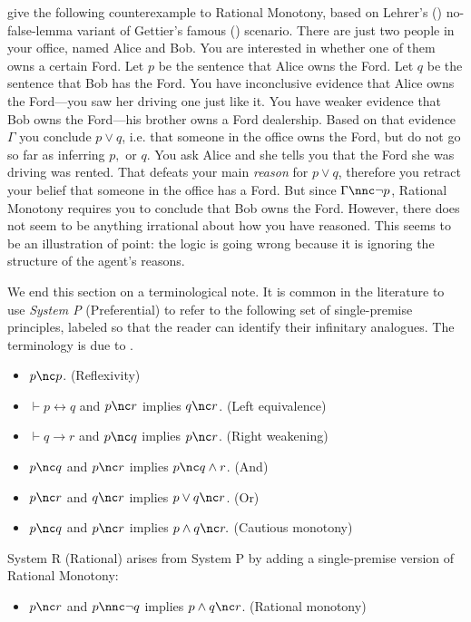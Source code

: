 \citet{lin2019correspondence} give the following counterexample to Rational
Monotony, based on Lehrer's () no-false-lemma
variant of Gettier's famous () scenario.
There are just two people in your office, named Alice and Bob. You are
interested in whether one of them owns a certain Ford. Let $p$ be the sentence
that Alice owns the Ford. Let $q$ be the sentence that Bob has the Ford. You
have inconclusive evidence that Alice owns the Ford---you saw her driving one
just like it. You have weaker evidence that Bob owns the Ford---his brother owns
a Ford dealership. Based on that evidence $\Gamma$ you conclude $p\vee q$, i.e.
that someone in the office owns the Ford, but do not go so far as inferring $p,$
or $q$. You ask Alice and she tells you that the Ford she was driving was
rented. That defeats your main {\em reason} for $p\vee q$, therefore you retract
your belief that someone in the office has a Ford. But since $\Gamma \nnc \neg
p$,  Rational Monotony requires you to conclude that Bob owns the Ford. However,
there does not seem to be anything irrational about how you have reasoned. This
seems to be an illustration of  point: the logic
is going wrong because it is ignoring the structure of the agent's reasons.

We end this section on a terminological note. It is common in the literature to
use \textit{System P} (Preferential) to refer to the following set of
single-premise principles, labeled so that the reader can identify their
infinitary analogues. The terminology is due to \citet{kraus1990nonmonotonic}.
\begin{itemize}
\item[] $p\nc p$. \hfill(Reflexivity)
\item[] $\vdash p \leftrightarrow q$ and $p \nc r$ implies $q \nc r$.
\hfill(Left equivalence)
\item[] $\vdash q \rightarrow r$ and $p \nc q$ implies $p \nc r$. \hfill(Right
weakening)
\item[] $p \nc q$ and $p \nc r$ implies $p \nc q\wedge r$. \hfill(And)
\item[] $p \nc r$ and $q\nc r$ implies $p\vee q \nc r$. \hfill(Or)
\item[] $p\nc q$ and $p\nc r$ implies $p\wedge q \nc r.$ \hfill(Cautious
monotony)
\end{itemize}
System R (Rational) arises from System P by adding  a single-premise version of
Rational Monotony:
\begin{itemize}
\item[] $p\nc r$ and $p \nnc \neg q$ implies $p\wedge q \nc r$. \hfill(Rational
monotony)
\end{itemize}


